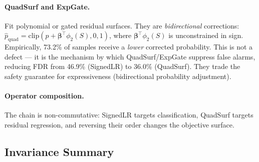 \documentclass[journal]{IEEEtran}
\begin{document}
\paragraph{QuadSurf and ExpGate.}
Fit polynomial or gated residual surfaces.  They are \emph{bidirectional} corrections: $\hat{p}_{\text{quad}} = \text{clip}(\hat{p} + \boldsymbol{\beta}^\top \phi_2(S), 0, 1)$, where $\boldsymbol{\beta}^\top \phi_2(S)$ is unconstrained in sign.  Empirically, 73.2\% of samples receive a \emph{lower} corrected probability.  This is not a defect --- it is the mechanism by which QuadSurf/ExpGate suppress false alarms, reducing FDR from 46.9\% (SignedLR) to 36.0\% (QuadSurf).  They trade the safety guarantee for expressiveness (bidirectional probability adjustment).

\paragraph{Operator composition.}
The chain is non-commutative: SignedLR targets classification, QuadSurf targets residual regression, and reversing their order changes the objective surface.

\subsection{Invariance Summary}
\end{document}
